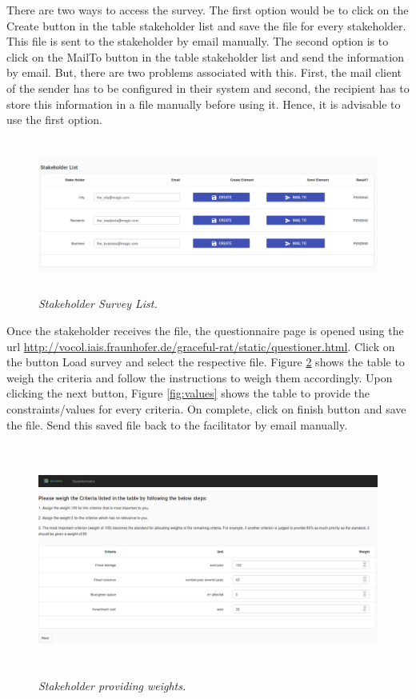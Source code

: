 \documentclass[a4paper]{article}
\begin{document}
There are two ways to access the survey. The first option would be to click on the Create button in the table stakeholder list and save the file for every stakeholder. This file is sent to the stakeholder by email manually. The second option is to click on the MailTo button in the table stakeholder list and send the information by email. But, there are two problems associated with this. First, the mail client of the sender has to be configured in their system and second, the recipient has to store this information in a file manually before using it. Hence, it is advisable to use the first option.

\begin{figure}
\begin{center}
\includegraphics[height=2in,width=5in]{img/sList.png}
\caption{\small \sl Stakeholder Survey List.\label{fig:sList}}
\end{center}
\end{figure}

Once the stakeholder receives the file, the questionnaire page is opened using the url \url{http://vocol.iais.fraunhofer.de/graceful-rat/static/questioner.html}. Click on the button Load survey and select the respective file. Figure \ref{fig:weights} shows the table to weigh the criteria and follow the instructions to weigh them accordingly. Upon clicking the next button, Figure \ref{fig:values} shows the table to provide the constraints/values for every criteria. On complete, click on finish button and save the file. Send this saved file back to the facilitator by email manually.

\begin{figure}
\begin{center}
\includegraphics[width=6in, height=3in]{img/weights.png}
\caption{\small \sl Stakeholder providing weights.\label{fig:weights}}
\end{center}
\end{figure}
\end{document}
